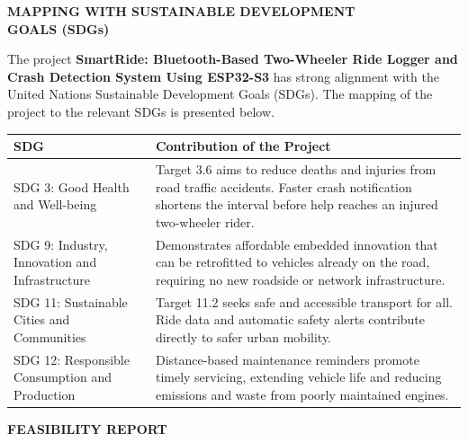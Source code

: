 \documentclass[12pt,a4paper,oneside]{report}
\begin{document}
\thispagestyle{empty}
\begin{center}{\large\bfseries MAPPING WITH SUSTAINABLE DEVELOPMENT\\[0.25em]
GOALS (SDGs)\par}\end{center}
\vspace{2.2em}

The project \textbf{SmartRide: Bluetooth-Based Two-Wheeler Ride Logger and Crash Detection
System Using ESP32-S3} has strong alignment with the United Nations Sustainable Development
Goals (SDGs). The mapping of the project to the relevant SDGs is presented below.

\vspace{1.6em}
\begin{center}
\begin{singlespace}
\small
\renewcommand{\arraystretch}{1.3}
\begin{tabular}{|L{1.3in}|J{3.5in}|}
\hline
\textbf{SDG} & \textbf{Contribution of the Project}\\
\hline
SDG 3: Good Health and Well-being & Target 3.6 aims to reduce deaths and injuries from road
traffic accidents. Faster crash notification shortens the interval before help reaches an
injured two-wheeler rider.\\
\hline
SDG 9: Industry, Innovation and Infrastructure & Demonstrates affordable embedded innovation
that can be retrofitted to vehicles already on the road, requiring no new roadside or
network infrastructure.\\
\hline
SDG 11: Sustainable Cities and Communities & Target 11.2 seeks safe and accessible transport
for all. Ride data and automatic safety alerts contribute directly to safer urban
mobility.\\
\hline
SDG 12: Responsible Consumption and Production & Distance-based maintenance reminders
promote timely servicing, extending vehicle life and reducing emissions and waste from
poorly maintained engines.\\
\hline
\end{tabular}
\end{singlespace}
\end{center}
\clearpage

\thispagestyle{empty}
\begin{center}{\large\bfseries FEASIBILITY REPORT\par}\end{center}
\vspace{2.0em}
\end{document}
